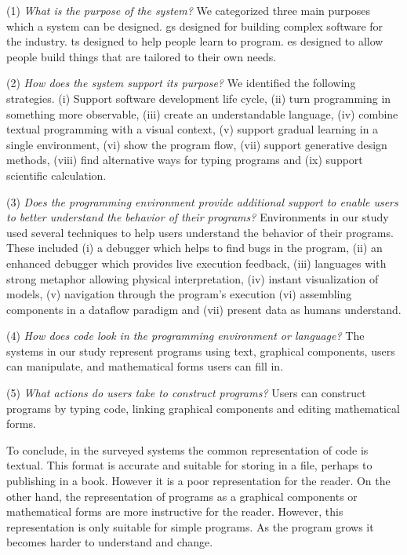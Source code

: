 (1) \textit{What is the purpose of the system?} We categorized three main purposes which a system can be designed. \ac{gs} designed for building complex software for the industry. \ac{ts} designed to help people learn to program. \ac{es} designed to allow people build things that are tailored to their own needs.

(2) \textit{How does the system support its purpose?} We identified the following strategies. (i) Support software development life cycle, (ii) turn programming in something more observable, (iii) create an understandable language, (iv) combine textual programming with a visual context, (v) support gradual learning in a single environment, (vi) show the program flow, (vii) support generative design methods, (viii) find alternative ways for typing programs and (ix) support scientific calculation.

(3) \textit{Does the programming environment provide additional support to enable users to better understand the behavior of their programs?} Environments in our study used several techniques to help users understand the behavior of their programs. These included (i) a debugger which helps to find bugs in the program, (ii) an enhanced debugger which provides live execution feedback, (iii) languages with strong metaphor allowing physical interpretation, (iv) instant visualization of models, (v) navigation through the program's execution (vi) assembling components in a dataflow paradigm and (vii) present data as humans understand.

(4) \textit{How does code look in the programming environment or language?} The systems in our study represent programs using text, graphical components, users can manipulate, and mathematical forms users can fill in.

(5) \textit{What actions do users take to construct programs?} Users can construct programs by typing code, linking graphical components and editing mathematical forms.

To conclude, in the surveyed systems the common representation of code is textual. This format is accurate and suitable for storing in a file, perhaps to publishing in a book. However it is a poor representation for the reader. On the other hand, the representation of programs as a graphical components or mathematical forms are more instructive for the reader. However, this representation is only suitable for simple programs. As the program grows it becomes harder to understand and change.